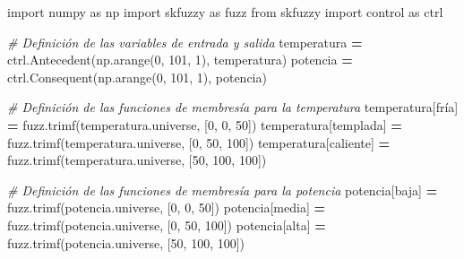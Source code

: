 \documentclass[
  a4paper,
  DIV=11,
  numbers=noendperiod]{scrreprt}
\newenvironment{Shaded}{\begin{snugshade}}{\end{snugshade}}
\newcommand{\CommentTok}[1]{\textcolor[rgb]{0.56,0.35,0.01}{\textit{#1}}}
\newcommand{\DecValTok}[1]{\textcolor[rgb]{0.00,0.00,0.81}{#1}}
\newcommand{\ImportTok}[1]{#1}
\newcommand{\NormalTok}[1]{#1}
\newcommand{\OperatorTok}[1]{\textcolor[rgb]{0.81,0.36,0.00}{\textbf{#1}}}
\newcommand{\StringTok}[1]{\textcolor[rgb]{0.31,0.60,0.02}{#1}}
\begin{document}
\begin{Shaded}
\begin{Highlighting}[numbers=left,,]
\ImportTok{import}\NormalTok{ numpy }\ImportTok{as}\NormalTok{ np}
\ImportTok{import}\NormalTok{ skfuzzy }\ImportTok{as}\NormalTok{ fuzz}
\ImportTok{from}\NormalTok{ skfuzzy }\ImportTok{import}\NormalTok{ control }\ImportTok{as}\NormalTok{ ctrl}

\CommentTok{\# Definición de las variables de entrada y salida}
\NormalTok{temperatura }\OperatorTok{=}\NormalTok{ ctrl.Antecedent(np.arange(}\DecValTok{0}\NormalTok{, }\DecValTok{101}\NormalTok{, }\DecValTok{1}\NormalTok{), }\StringTok{\textquotesingle{}temperatura\textquotesingle{}}\NormalTok{)}
\NormalTok{potencia }\OperatorTok{=}\NormalTok{ ctrl.Consequent(np.arange(}\DecValTok{0}\NormalTok{, }\DecValTok{101}\NormalTok{, }\DecValTok{1}\NormalTok{), }\StringTok{\textquotesingle{}potencia\textquotesingle{}}\NormalTok{)}

\CommentTok{\# Definición de las funciones de membresía para la temperatura}
\NormalTok{temperatura[}\StringTok{\textquotesingle{}fría\textquotesingle{}}\NormalTok{] }\OperatorTok{=}\NormalTok{ fuzz.trimf(temperatura.universe, [}\DecValTok{0}\NormalTok{, }\DecValTok{0}\NormalTok{, }\DecValTok{50}\NormalTok{])}
\NormalTok{temperatura[}\StringTok{\textquotesingle{}templada\textquotesingle{}}\NormalTok{] }\OperatorTok{=}\NormalTok{ fuzz.trimf(temperatura.universe, [}\DecValTok{0}\NormalTok{, }\DecValTok{50}\NormalTok{, }\DecValTok{100}\NormalTok{])}
\NormalTok{temperatura[}\StringTok{\textquotesingle{}caliente\textquotesingle{}}\NormalTok{] }\OperatorTok{=}\NormalTok{ fuzz.trimf(temperatura.universe, [}\DecValTok{50}\NormalTok{, }\DecValTok{100}\NormalTok{, }\DecValTok{100}\NormalTok{])}

\CommentTok{\# Definición de las funciones de membresía para la potencia}
\NormalTok{potencia[}\StringTok{\textquotesingle{}baja\textquotesingle{}}\NormalTok{] }\OperatorTok{=}\NormalTok{ fuzz.trimf(potencia.universe, [}\DecValTok{0}\NormalTok{, }\DecValTok{0}\NormalTok{, }\DecValTok{50}\NormalTok{])}
\NormalTok{potencia[}\StringTok{\textquotesingle{}media\textquotesingle{}}\NormalTok{] }\OperatorTok{=}\NormalTok{ fuzz.trimf(potencia.universe, [}\DecValTok{0}\NormalTok{, }\DecValTok{50}\NormalTok{, }\DecValTok{100}\NormalTok{])}
\NormalTok{potencia[}\StringTok{\textquotesingle{}alta\textquotesingle{}}\NormalTok{] }\OperatorTok{=}\NormalTok{ fuzz.trimf(potencia.universe, [}\DecValTok{50}\NormalTok{, }\DecValTok{100}\NormalTok{, }\DecValTok{100}\NormalTok{])}


\end{Highlighting}
\end{Shaded}
\end{document}
